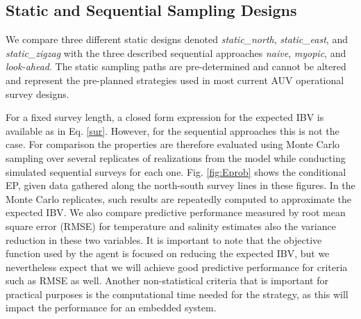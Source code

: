 \documentclass[aoas]{imsart}
\newcommand{\edcomment}[1]{{\color{green}{\{Editor: #1\}}}}
\begin{document}
\subsection{Static and Sequential Sampling Designs}\label{sec:sampling_designs}


We compare three different static designs denoted
\textit{static\_north}, \textit{static\_east}, and
\textit{static\_zigzag} with the three described sequential approaches
\textit{naive}, \textit{myopic}, and \textit{look-ahead}. The static sampling paths are pre-determined and cannot be altered and represent the pre-planned strategies used in most current AUV
operational survey designs.

For a fixed survey length, a closed form expression for the expected IBV is available as in Eq. \eqref{sur}. However, for the sequential approaches this is not the
case. For comparison the properties are therefore evaluated using
Monte Carlo sampling over several replicates of realizations from the model while conducting simulated sequential surveys for each
one. Fig. \ref{fig:Eprob} shows the conditional EP, given data
gathered along the north-south survey lines in these figures. In the
Monte Carlo replicates, such results are repeatedly computed to
approximate the expected IBV. We also compare predictive performance
measured by root mean square error (RMSE) for temperature and salinity
estimates \edcomment{as well as} also the variance reduction in these two variables. It is
important to note that the objective function used by the agent is
focused on reducing the expected IBV, but we nevertheless expect that
we will achieve good predictive performance for criteria such as RMSE
as well. Another non-statistical criteria that is important for
practical purposes is the computational time needed for the strategy,
as this will impact the performance for an embedded system.
\end{document}
